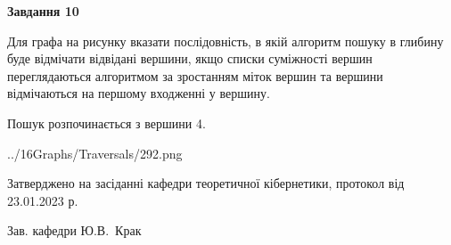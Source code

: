 \documentclass[12pt, ukrainian]{article}
\begin{document}
{\begin {large}
{\begin {center}\textbf{Завдання 10}\end {center}}\par
Для графа на рисунку вказати послідовність, в якій алгоритм пошуку в глибину буде відмічати відвідані вершини, якщо списки суміжності вершин переглядаються алгоритмом за зростанням міток вершин та вершини відмічаються на першому вход\-женні у вершину.\par
Пошук розпочинається з вершини 4.\par

\begin{center}
	{../16Graphs/Traversals/292.png}
\end{center}\par
\newpage


\end {large}
}
{\smallskip \begin {small} Затверджено на засіданні кафедри теоретичної кібернетики, протокол  від   23.01.2023 р.\par\smallskip\smallskip
{\parbox {6.5 cm}{Зав. кафедри \dotfill Ю.В.~Крак}} \end{small}}
\end{document}
